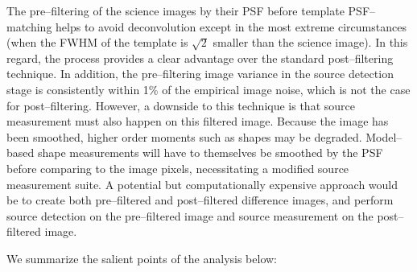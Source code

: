 \documentclass[floatfix, apj]{emulateapj}
\begin{document}
The pre--filtering of the science images by their PSF before template PSF--matching helps to avoid deconvolution except in the most extreme circumstances (when the FWHM of the template is $\sqrt{2}$ smaller than the science image).
In this regard, the process provides a clear advantage over the standard post--filtering technique.
In addition, the pre--filtering image variance in the source detection stage is consistently within 1\% of the empirical image noise, which is not the case for post--filtering.
However, a downside to this technique is that source measurement must also happen on this filtered image.
Because the image has been smoothed, higher order moments such as shapes may be degraded.
Model--based shape measurements will have to themselves be smoothed by the PSF before comparing to the image pixels, necessitating a modified source measurement suite.
A potential but computationally expensive approach would be to create both pre--filtered and post--filtered difference images, and perform source detection on the pre--filtered image and source measurement on the post--filtered image.

We summarize the salient points of the analysis below:
\end{document}
